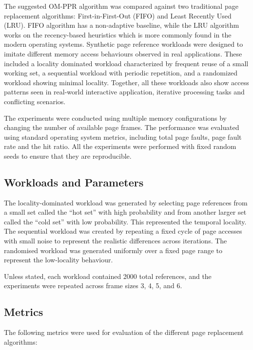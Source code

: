 \documentclass[conference]{IEEEtran}
\begin{document}
The suggested OM-PPR algorithm was compared against two traditional page replacement algorithms: First-in-First-Out (FIFO) and Least Recently Used (LRU). FIFO algorithm has a non-adaptive baseline, while the LRU algorithm works on the recency-based heuristics which is more commonly found in the modern operating systems. Synthetic page reference workloads were designed to imitate different memory access behaviours observed in real applications. These included a locality dominated workload characterized by frequent reuse of a small working set, a sequential workload with periodic repetition, and a randomized workload showing minimal locality. Together, all these workloads also show access patterns seen in real-world interactive application, iterative processing tasks and conflicting scenarios.

The experiments were conducted using multiple memory configurations by changing the number of available page frames. The performance was evaluated using standard operating system metrics, including total page faults, page fault rate and the hit ratio. All the experiments were performed with fixed random seeds to ensure that they are reproducible.
\vspace{0.7\baselineskip}


\subsection{Workloads and Parameters}

The locality-dominated workload was generated by selecting page references from a small set called the ``hot set'' with high probability and from another larger set called the ``cold set'' with low probability. This represented the temporal locality. The sequential workload was created by repeating a fixed cycle of page accesses with small noise to represent the realistic differences across iterations. The randomised workload was generated uniformly over a fixed page range to represent the low-locality behaviour.

Unless stated, each workload contained 2000 total references, and the experiments were repeated across frame sizes 3, 4, 5, and 6.
\vspace{0.7\baselineskip}


\subsection{Metrics}

The following metrics were used for evaluation of the different page replacement algorithms:
\end{document}
